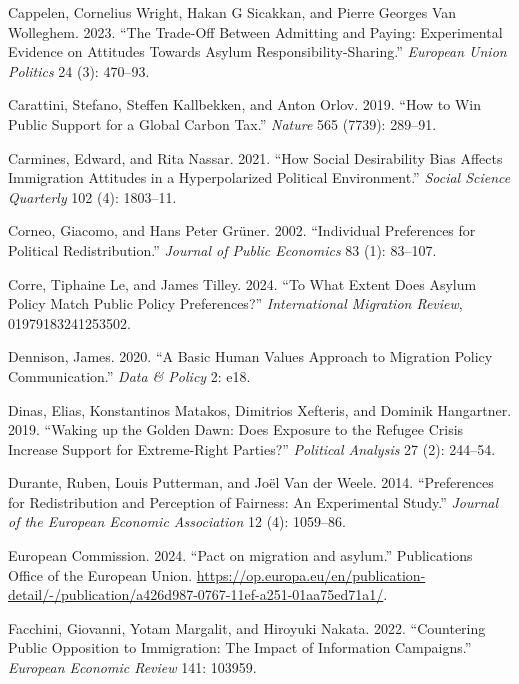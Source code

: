 \documentclass[
  12pt,
  a4paper,
]{article}
\newlength{\cslhangindent}
\newenvironment{CSLReferences}[2] %
 {\begin{list}{}{%
  \setlength{\itemindent}{0pt}
  \setlength{\leftmargin}{0pt}
  \setlength{\parsep}{0pt}
  \ifodd #1
   \setlength{\leftmargin}{\cslhangindent}
   \setlength{\itemindent}{-1\cslhangindent}
  \fi
  \setlength{\itemsep}{#2\baselineskip}}}
 {\end{list}}
\begin{document}
\begin{CSLReferences}{1}{0}
Cappelen, Cornelius Wright, Hakan G Sicakkan, and Pierre Georges Van Wolleghem. 2023. {``The Trade-Off Between Admitting and Paying: Experimental Evidence on Attitudes Towards Asylum Responsibility-Sharing.''} \emph{European Union Politics} 24 (3): 470--93.

Carattini, Stefano, Steffen Kallbekken, and Anton Orlov. 2019. {``How to Win Public Support for a Global Carbon Tax.''} \emph{Nature} 565 (7739): 289--91.

Carmines, Edward, and Rita Nassar. 2021. {``How Social Desirability Bias Affects Immigration Attitudes in a Hyperpolarized Political Environment.''} \emph{Social Science Quarterly} 102 (4): 1803--11.

Corneo, Giacomo, and Hans Peter Grüner. 2002. {``Individual Preferences for Political Redistribution.''} \emph{Journal of Public Economics} 83 (1): 83--107.

Corre, Tiphaine Le, and James Tilley. 2024. {``To What Extent Does Asylum Policy Match Public Policy Preferences?''} \emph{International Migration Review}, 01979183241253502.

Dennison, James. 2020. {``A Basic Human Values Approach to Migration Policy Communication.''} \emph{Data \& Policy} 2: e18.

Dinas, Elias, Konstantinos Matakos, Dimitrios Xefteris, and Dominik Hangartner. 2019. {``Waking up the Golden Dawn: Does Exposure to the Refugee Crisis Increase Support for Extreme-Right Parties?''} \emph{Political Analysis} 27 (2): 244--54.

Durante, Ruben, Louis Putterman, and Joël Van der Weele. 2014. {``Preferences for Redistribution and Perception of Fairness: An Experimental Study.''} \emph{Journal of the European Economic Association} 12 (4): 1059--86.

European Commission. 2024. {``{Pact on migration and asylum}.''} Publications Office of the European Union. \url{https://op.europa.eu/en/publication-detail/-/publication/a426d987-0767-11ef-a251-01aa75ed71a1/}.

Facchini, Giovanni, Yotam Margalit, and Hiroyuki Nakata. 2022. {``Countering Public Opposition to Immigration: The Impact of Information Campaigns.''} \emph{European Economic Review} 141: 103959.


\end{CSLReferences}
\end{document}
